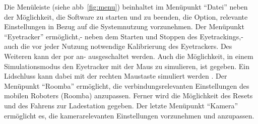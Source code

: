 Die Menüleiste (siehe \acs{abb}~\ref{fig:menu}) beinhaltet im Menüpunkt \enquote{Datei} neben der Möglichkeit, die Software zu starten und zu beenden, die Option, relevante Einstellungen in Bezug auf die Systemnutzung vorzunehmen. Der Menüpunkt \enquote{Eyetracker} ermöglicht,- neben dem Starten und Stoppen des Eyetrackings,- auch die vor jeder Nutzung notwendige Kalibrierung des Eyetrackers. Des Weiteren kann der \acs{por} an- \bzw ausgeschaltet werden. Auch die Möglichkeit, in einem Simulationsmodus den Eyetracker mit der Maus zu simulieren, ist gegeben. Ein Lidschluss kann dabei mit der rechten Maustaste simuliert werden \cite{Eidam2015}. Der Menüpunkt \enquote{Roomba} ermöglicht, die verbindungsrelevanten Einstellungen des mobilen Roboters (Roomba) anzupassen. Ferner wird die Möglichkeit des Resets und des Fahrens zur Ladestation gegeben. Der letzte Menüpunkt \enquote{Kamera} ermöglicht es, die kamerarelevanten Einstellungen vorzunehmen und anzupassen.
